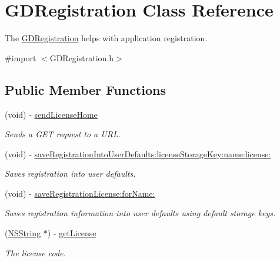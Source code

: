 \hypertarget{interface_g_d_registration}{
\section{GDRegistration Class Reference}
\label{interface_g_d_registration}
}


The \hyperlink{interface_g_d_registration}{GDRegistration} helps with application registration.  


{\ttfamily \#import $<$GDRegistration.h$>$}\subsection*{Public Member Functions}
\begin{DoxyCompactItemize}
\item 
(void) -\/ \hyperlink{interface_g_d_registration_a2aab3c30ff8931c4ce11159ecb3b830c}{sendLicenseHome}
\begin{DoxyCompactList}\small\item\em Sends a GET request to a URL. \item\end{DoxyCompactList}\item 
(void) -\/ \hyperlink{interface_g_d_registration_acc5044a15435a573919d7f6c68a70ff0}{saveRegistrationIntoUserDefaults:licenseStorageKey:name:license:}
\begin{DoxyCompactList}\small\item\em Saves registration into user defaults. \item\end{DoxyCompactList}\item 
(void) -\/ \hyperlink{interface_g_d_registration_a4ce808c5e052ea5080329c56b89df626}{saveRegistrationLicense:forName:}
\begin{DoxyCompactList}\small\item\em Saves registration information into user defaults using default storage keys. \item\end{DoxyCompactList}\item 
(\hyperlink{class_n_s_string}{NSString} $\ast$) -\/ \hyperlink{interface_g_d_registration_ad8830b56a002a550f28c095233078aba}{getLicense}
\begin{DoxyCompactList}\small\item\em The license code. \item\end{DoxyCompactList}\item 

\end{DoxyCompactItemize}
